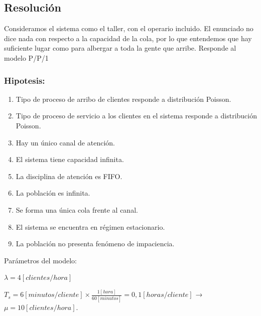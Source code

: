 \documentclass[a4paper,11pt]{article}
\begin{document}
\vspace{13pt}
\leftskip=0pt
\parindent=0pt
\subsection*{\textbf{Resolución}}

Consideramos el sistema como el taller, con el operario incluido. El enunciado
no dice nada con respecto a la capacidad de la cola, por lo que entendemos que
hay suficiente lugar como para albergar a toda la gente que arribe. Responde al
modelo P/P/1

\vspace{5pt}
\subsubsection*{Hipotesis:}

\begin{enumerate}[1.]
  \item Tipo de proceso de arribo de clientes responde a distribución Poisson.
  \item Tipo de proceso de servicio a los clientes en el sistema responde a
    distribución Poisson.
  \item Hay un único canal de atención.
  \item El sistema tiene capacidad infinita.
  \item La disciplina de atención es FIFO.
  \item La población es infinita.
  \item Se forma una única cola frente al canal.
  \item El sistema se encuentra en régimen estacionario.
  \item La población no presenta fenómeno de impaciencia.
\end{enumerate}

\vspace{13pt}
Parámetros del modelo:

$\lambda = 4 [clientes/hora]$

$T_s = 6 [minutos/cliente] \times \frac{1[hora]}{60[minutos]} = 0,1
[horas/cliente]$ → $\mu = 10 [clientes/hora]$.
\end{document}
